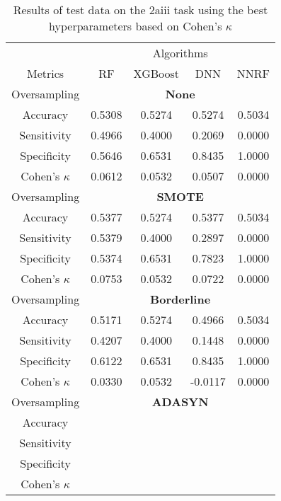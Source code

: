 \begin{table}[!htb]
\centering
\caption{Results of test data on the 2aiii task using the best hyperparameters based on Cohen's $\kappa$}
\label{tab:2aiii_test_results}
\begin{tabular}{c | c c c c}
\hline
 & \multicolumn{4}{c}{Algorithms}\\ 
Metrics &RF & XGBoost & DNN & NNRF\\ 
\hline
Oversampling &\multicolumn{4}{|c}{\textbf{None}}\\ 
\hline
Accuracy & 0.5308 & 0.5274 & 0.5274 & 0.5034\\ 
Sensitivity & 0.4966 & 0.4000 & 0.2069 & 0.0000\\ 
Specificity & 0.5646 & 0.6531 & 0.8435 & 1.0000\\ 
Cohen's $\kappa$ & 0.0612 & 0.0532 & 0.0507 & 0.0000\\ 
\hline
Oversampling &\multicolumn{4}{|c}{\textbf{SMOTE}}\\ 
\hline
Accuracy & 0.5377 & 0.5274 & 0.5377 & 0.5034\\ 
Sensitivity & 0.5379 & 0.4000 & 0.2897 & 0.0000\\ 
Specificity & 0.5374 & 0.6531 & 0.7823 & 1.0000\\ 
Cohen's $\kappa$ & 0.0753 & 0.0532 & 0.0722 & 0.0000\\ 
\hline
Oversampling &\multicolumn{4}{|c}{\textbf{Borderline}}\\ 
\hline
Accuracy & 0.5171 & 0.5274 & 0.4966 & 0.5034\\ 
Sensitivity & 0.4207 & 0.4000 & 0.1448 & 0.0000\\ 
Specificity & 0.6122 & 0.6531 & 0.8435 & 1.0000\\ 
Cohen's $\kappa$ & 0.0330 & 0.0532 & -0.0117 & 0.0000\\ 
\hline
Oversampling &\multicolumn{4}{|c}{\textbf{ADASYN}}\\ 
\hline
Accuracy &  &  &  & \\ 
Sensitivity &  &  &  & \\ 
Specificity &  &  &  & \\ 
Cohen's $\kappa$ &  &  &  & \\ 
\hline
\end{tabular}
\end{table}


